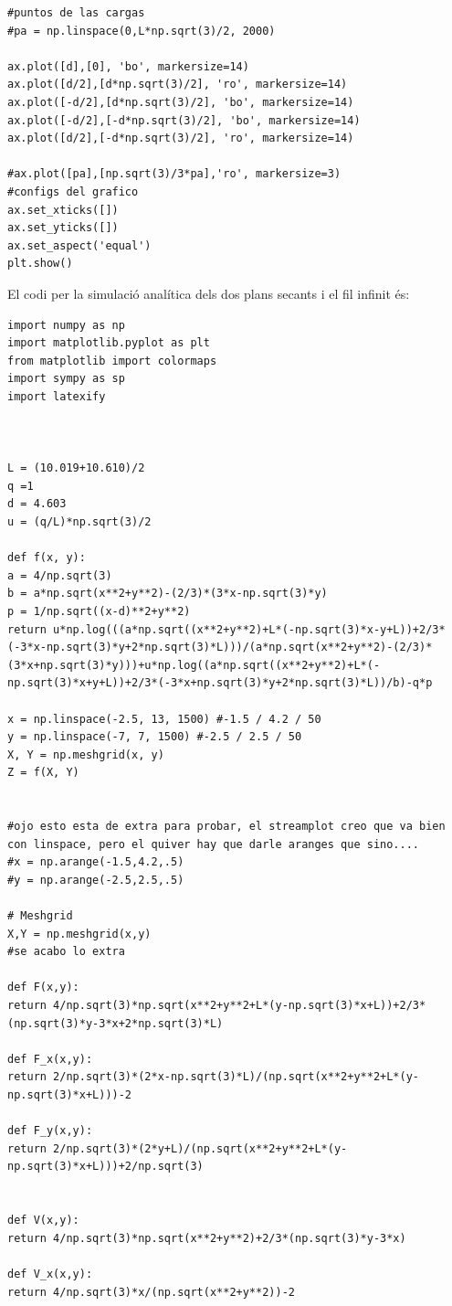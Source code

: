 \documentclass[a4paper,10.5pt]{report}
\begin{document}
\begin{appendices}
\begin{lstlisting}
#puntos de las cargas
#pa = np.linspace(0,L*np.sqrt(3)/2, 2000)

ax.plot([d],[0], 'bo', markersize=14)
ax.plot([d/2],[d*np.sqrt(3)/2], 'ro', markersize=14)
ax.plot([-d/2],[d*np.sqrt(3)/2], 'bo', markersize=14)
ax.plot([-d/2],[-d*np.sqrt(3)/2], 'bo', markersize=14)
ax.plot([d/2],[-d*np.sqrt(3)/2], 'ro', markersize=14)

#ax.plot([pa],[np.sqrt(3)/3*pa],'ro', markersize=3)
#configs del grafico
ax.set_xticks([])
ax.set_yticks([])
ax.set_aspect('equal')
plt.show()
\end{lstlisting}

El codi per la simulació analítica dels dos plans secants i el fil infinit és:
\begin{lstlisting}
import numpy as np
import matplotlib.pyplot as plt
from matplotlib import colormaps
import sympy as sp
import latexify



L = (10.019+10.610)/2
q =1
d = 4.603
u = (q/L)*np.sqrt(3)/2

def f(x, y):
a = 4/np.sqrt(3)
b = a*np.sqrt(x**2+y**2)-(2/3)*(3*x-np.sqrt(3)*y)
p = 1/np.sqrt((x-d)**2+y**2)
return u*np.log(((a*np.sqrt((x**2+y**2)+L*(-np.sqrt(3)*x-y+L))+2/3*(-3*x-np.sqrt(3)*y+2*np.sqrt(3)*L)))/(a*np.sqrt(x**2+y**2)-(2/3)*(3*x+np.sqrt(3)*y)))+u*np.log((a*np.sqrt((x**2+y**2)+L*(-np.sqrt(3)*x+y+L))+2/3*(-3*x+np.sqrt(3)*y+2*np.sqrt(3)*L))/b)-q*p

x = np.linspace(-2.5, 13, 1500) #-1.5 / 4.2 / 50
y = np.linspace(-7, 7, 1500) #-2.5 / 2.5 / 50
X, Y = np.meshgrid(x, y)
Z = f(X, Y)


#ojo esto esta de extra para probar, el streamplot creo que va bien con linspace, pero el quiver hay que darle aranges que sino....
#x = np.arange(-1.5,4.2,.5)
#y = np.arange(-2.5,2.5,.5) 

# Meshgrid 
X,Y = np.meshgrid(x,y)
#se acabo lo extra

def F(x,y):
return 4/np.sqrt(3)*np.sqrt(x**2+y**2+L*(y-np.sqrt(3)*x+L))+2/3*(np.sqrt(3)*y-3*x+2*np.sqrt(3)*L)

def F_x(x,y):
return 2/np.sqrt(3)*(2*x-np.sqrt(3)*L)/(np.sqrt(x**2+y**2+L*(y-np.sqrt(3)*x+L)))-2

def F_y(x,y):
return 2/np.sqrt(3)*(2*y+L)/(np.sqrt(x**2+y**2+L*(y-np.sqrt(3)*x+L)))+2/np.sqrt(3)


def V(x,y):
return 4/np.sqrt(3)*np.sqrt(x**2+y**2)+2/3*(np.sqrt(3)*y-3*x)

def V_x(x,y):
return 4/np.sqrt(3)*x/(np.sqrt(x**2+y**2))-2


\end{lstlisting}
\end{appendices}
\end{document}
